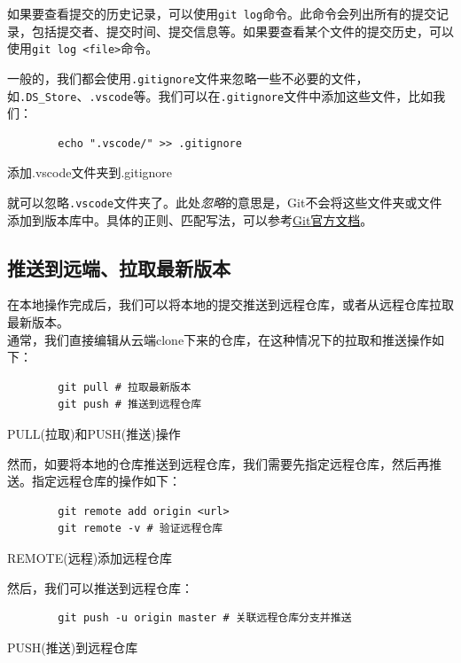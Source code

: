 如果要查看提交的历史记录，可以使用\texttt{git log}命令。此命令会列出所有的提交记录，包括提交者、提交时间、提交信息等。如果要查看某个文件的提交历史，可以使用\texttt{git log <file>}命令。

一般的，我们都会使用\texttt{.gitignore}文件来忽略一些不必要的文件，如\texttt{.DS\_Store}、\texttt{.vscode}等。我们可以在\texttt{.gitignore}文件中添加这些文件，比如我们：

\begin{listing}[h!]
    \begin{verbatim}
        echo ".vscode/" >> .gitignore
    \end{verbatim}
    \caption{添加.vscode文件夹到.gitignore}
\end{listing}

就可以忽略\texttt{.vscode}文件夹了。此处\textit{忽略}的意思是，Git不会将这些文件夹或文件添加到版本库中。具体的正则、匹配写法，可以参考\href{https://git-scm.com/docs/gitignore}{Git官方文档}。

\subsection{推送到远端、拉取最新版本}

在本地操作完成后，我们可以将本地的提交推送到远程仓库，或者从远程仓库拉取最新版本。\\

通常，我们直接编辑从云端clone下来的仓库，在这种情况下的拉取和推送操作如下：

\begin{listing}[!htpb]
    \begin{verbatim}
        git pull # 拉取最新版本
        git push # 推送到远程仓库
    \end{verbatim}
    \caption{PULL(拉取)和PUSH(推送)操作}
\end{listing}

然而，如要将本地的仓库推送到远程仓库，我们需要先指定远程仓库，然后再推送。指定远程仓库的操作如下：

\begin{listing}[!htpb]
    \begin{verbatim}
        git remote add origin <url>
        git remote -v # 验证远程仓库
    \end{verbatim}
    \caption{REMOTE(远程)添加远程仓库}
\end{listing}

然后，我们可以推送到远程仓库：

\begin{listing}[!htpb]
    \begin{verbatim}
        git push -u origin master # 关联远程仓库分支并推送
    \end{verbatim}
    \caption{PUSH(推送)到远程仓库}
\end{listing}

